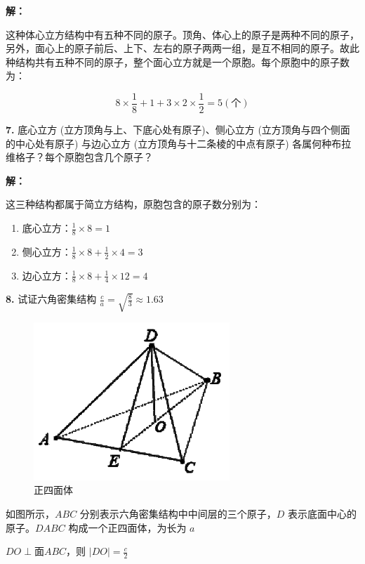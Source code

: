 \noindent \textbf{解：}

这种体心立方结构中有五种不同的原子。顶角、体心上的原子是两种不同的原子，另外，面心上的原子前后、上下、左右的原子两两一组，是互不相同的原子。故此种结构共有五种不同的原子，整个面心立方就是一个原胞。每个原胞中的原子数为：

\begin{equation*}
    8 \times \frac{1}{8} + 1 + 3 \times 2\times \frac{1}{2} = 5 (\text{个})
\end{equation*}

\noindent \textbf{7.\quad} 底心立方 (立方顶角与上、下底心处有原子)、侧心立方 (立方顶角与四个侧面的中心处有原子) 与边心立方 (立方顶角与十二条棱的中点有原子) 各属何种布拉维格子？每个原胞包含几个原子？

\noindent \textbf{解：}

这三种结构都属于简立方结构，原胞包含的原子数分别为：

\begin{enumerate}
    \item 底心立方：$\frac{1}{8} \times 8 = 1$
    \item 侧心立方：$\frac{1}{8} \times 8 + \frac{1}{2} \times 4 = 3$
    \item 边心立方：$\frac{1}{8} \times 8 + \frac{1}{4} \times 12 = 4$
\end{enumerate}

\noindent \textbf{8.\quad} 试证六角密集结构 $\frac{c}{a}=\sqrt{\frac{8}{3}}\approx 1.63$

\begin{figure}[htbp]
    \centering
    \includegraphics{pic/正四面体.png}
    \caption{正四面体}
    \label{fig:1.4}
\end{figure}

如图所示，$ABC$ 分别表示六角密集结构中中间层的三个原子，$D$ 表示底面中心的原子。$DABC$ 构成一个正四面体，为长为 $a$

$DO \perp \text{面} ABC$，则 $|DO|=\frac{c}{2}$

